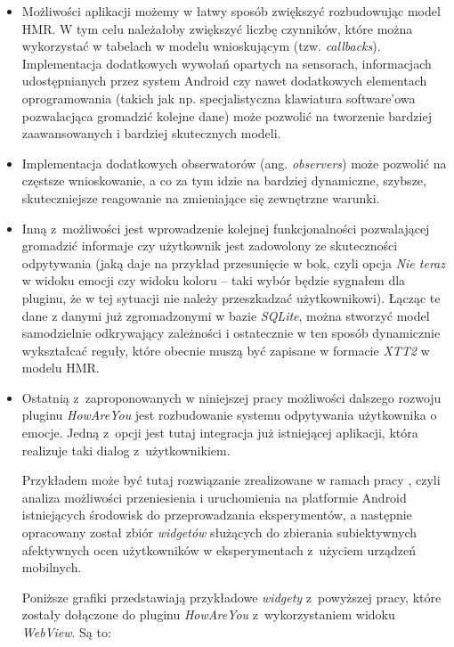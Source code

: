 \begin{itemize}
	\item Możliwości aplikacji możemy w łatwy sposób zwiększyć rozbudowując model HMR. W tym celu należałoby zwiększyć liczbę czynników, które można wykorzystać w tabelach w modelu wnioskującym (tzw. \textit{callbacks}). Implementacja dodatkowych wywołań opartych na sensorach, informacjach udostępnianych przez system Android czy nawet dodatkowych elementach oprogramowania (takich jak np. specjalistyczna klawiatura software'owa pozwalacjąca gromadzić kolejne dane) może pozwolić na tworzenie bardziej zaawansowanych i bardziej skutecznych modeli.
	
	\item Implementacja dodatkowych obserwatorów (ang. \textit{observers}) może pozwolić na częstsze wnioskowanie, a co za tym idzie na bardziej dynamiczne, szybsze, skuteczniejsze reagowanie na zmieniające się zewnętrzne warunki.
	
	\item Inną z~możliwości jest wprowadzenie kolejnej funkcjonalności pozwalającej gromadzić informaje czy użytkownik jest zadowolony ze skuteczności odpytywania (jaką daje na przykład przesunięcie w bok, czyli opcja \textit{Nie teraz} w widoku emocji czy widoku koloru -- taki wybór będzie sygnałem dla pluginu, że w tej sytuacji nie należy przeszkadzać użytkownikowi). Łącząc te dane z danymi już zgromadzonymi w bazie \textit{SQLite}, można stworzyć model samodzielnie odkrywający zależności i ostatecznie w ten sposób dynamicznie wykształcać reguły, które obecnie muszą być zapisane w formacie \textit{XTT2} w modelu HMR.
	
	\item Ostatnią z~zaproponowanych w niniejszej pracy możliwości dalszego rozwoju pluginu \textit{HowAreYou} jest rozbudowanie systemu odpytywania użytkownika o emocje. Jedną z~opcji jest tutaj integracja już istniejącej aplikacji, która realizuje taki dialog z~użytkownikiem. 
	
	Przykładem może być tutaj rozwiązanie zrealizowane w ramach pracy \cite{ArkadiuszLis}, czyli analiza możliwości przeniesienia i uruchomienia na platformie Android istniejących środowisk do przeprowadzania eksperymentów, a następnie	opracowany został zbiór \textit{widgetów} służących do zbierania subiektywnych afektywnych ocen użytkowników w eksperymentach z~użyciem urządzeń mobilnych.
	
	Poniższe grafiki przedstawiają przykładowe \textit{widgety} z~powyższej pracy, które zostały dołączone do pluginu \textit{HowAreYou} z~wykorzystaniem widoku \textit{WebView}. Są to:
	

\end{itemize}
